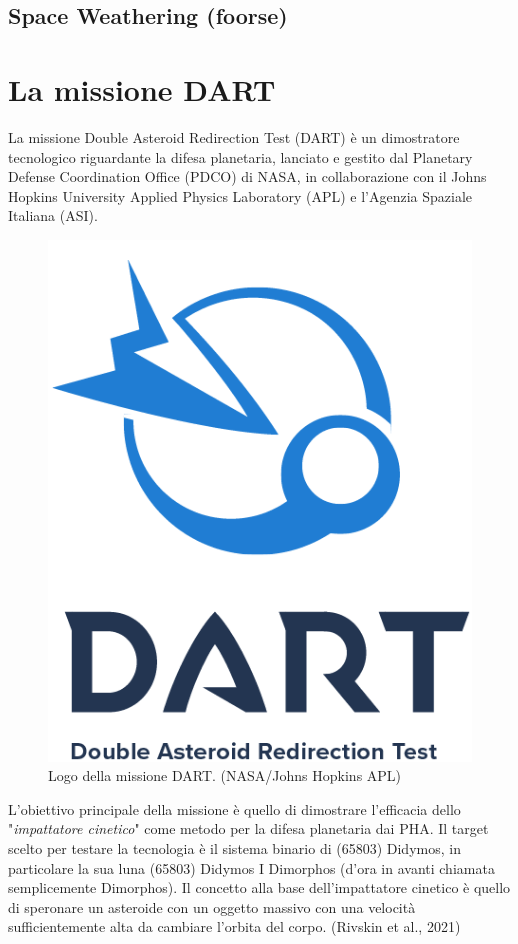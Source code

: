 \documentclass[a4paper,11pt,openright]{book}
\begin{document}
\section{Space Weathering (foorse)}

\chapter{La missione DART}

La missione Double Asteroid Redirection Test (DART) è un dimostratore tecnologico riguardante la difesa planetaria, lanciato e gestito dal Planetary Defense Coordination Office (PDCO) di NASA, in collaborazione con il Johns Hopkins University Applied Physics Laboratory (APL) e l'Agenzia Spaziale Italiana (ASI).

\begin{figure}[!h]
    \centering
    \includegraphics[scale=0.5]{figure/DART_mission_patch.png}
    \caption[Logo della missione DART]{Logo della missione DART. (NASA/Johns Hopkins APL)}
    \label{fig:logo_DART}
\end{figure}

L'obiettivo principale della missione è quello di dimostrare l'efficacia dello "\textit{impattatore cinetico}" come metodo per la difesa planetaria dai PHA. Il target scelto per testare la tecnologia è il sistema binario di (65803) Didymos, in particolare la sua luna (65803) Didymos I Dimorphos (d'ora in avanti chiamata semplicemente Dimorphos). Il concetto alla base dell'impattatore cinetico è quello di speronare un asteroide con un oggetto massivo con una velocità sufficientemente alta da cambiare l'orbita del corpo. (Rivskin et al., 2021)
\end{document}
